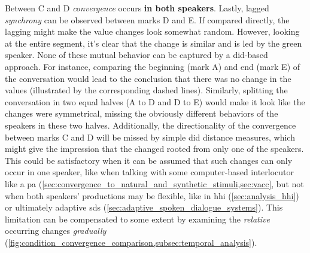 Between C and D \emph{convergence} occurs \textbf{in both speakers}.
Lastly, lagged \emph{synchrony} can be observed between marks D and E.
If compared directly, the lagging might make the value changes look somewhat random.
However, looking at the entire segment, it's clear that the change is similar and is led by the green speaker.
None of these mutual behavior can be captured by a \ac{did}-based approach.
For instance, comparing the beginning (mark A) and end (mark E) of the conversation would lead to the conclusion that there was no change in the values (illustrated by the corresponding dashed lines).
Similarly, splitting the conversation in two equal halves (A to D and D to E) would make it look like the changes were symmetrical, missing the obviously different behaviors of the speakers in these two halves.
Additionally, the directionality of the convergence between marks C and D will be missed by simple \ac{did} distance measures, which might give the impression that the changed rooted from only one of the speakers.
This could be satisfactory when it can be assumed that such changes can only occur in one speaker, like when talking with some computer-based interlocutor like a \ac{pa} (\cref{sec:convergence_to_natural_and_synthetic_stimuli,sec:vacc}, but not when both speakers' productions may be flexible, like in \ac{hhi} (\cref{sec:analysis_hhi}) or ultimately adaptive \acl{sds} (\cref{sec:adaptive_spoken_dialogue_systems}).
This limitation can be compensated to some extent by examining the \emph{relative} occurring changes \emph{gradually} (\cref{fig:condition_convergence_comparison,subsec:temporal_analysis}).


